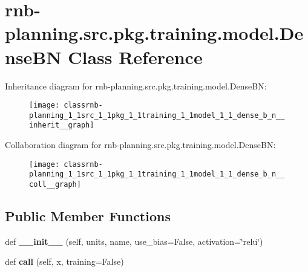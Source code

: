 \hypertarget{classrnb-planning_1_1src_1_1pkg_1_1training_1_1model_1_1_dense_b_n}{}\section{rnb-\/planning.src.\+pkg.\+training.\+model.\+Dense\+BN Class Reference}
\label{classrnb-planning_1_1src_1_1pkg_1_1training_1_1model_1_1_dense_b_n}


Inheritance diagram for rnb-\/planning.src.\+pkg.\+training.\+model.\+Dense\+BN\+:\nopagebreak
\begin{figure}[H]
\begin{center}
\leavevmode
\texttt{[image: classrnb-planning\_1\_1src\_1\_1pkg\_1\_1training\_1\_1model\_1\_1\_dense\_b\_n\_\_inherit\_\_graph]}
\end{center}
\end{figure}


Collaboration diagram for rnb-\/planning.src.\+pkg.\+training.\+model.\+Dense\+BN\+:\nopagebreak
\begin{figure}[H]
\begin{center}
\leavevmode
\texttt{[image: classrnb-planning\_1\_1src\_1\_1pkg\_1\_1training\_1\_1model\_1\_1\_dense\_b\_n\_\_coll\_\_graph]}
\end{center}
\end{figure}
\subsection*{Public Member Functions}
\begin{DoxyCompactItemize}
\item 
\mbox{\label{classrnb-planning_1_1src_1_1pkg_1_1training_1_1model_1_1_dense_b_n_a1126b65003e3fb4a325d175524a80f27}} 
def {\bfseries \+\_\+\+\_\+init\+\_\+\+\_\+} (self, units, name, use\+\_\+bias=False, activation=\char`\"{}relu\char`\"{})
\item 
\mbox{\label{classrnb-planning_1_1src_1_1pkg_1_1training_1_1model_1_1_dense_b_n_a58f2878b39b10bfd95df208f059f8b6a}} 
def {\bfseries call} (self, x, training=False)
\end{DoxyCompactItemize}
